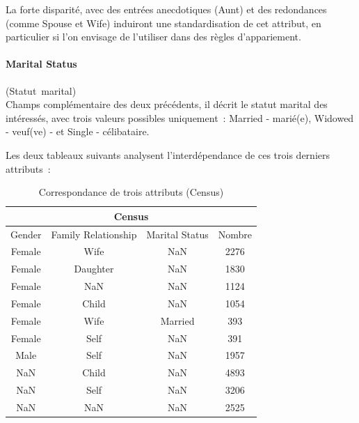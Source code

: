 \documentclass[a4paper,12pt,twoside]{book}
\begin{document}
                La forte disparité, avec des entrées anecdotiques (\og{}Aunt\fg{}) et des redondances (comme \og{}Spouse\fg{} et \og{}Wife\fg{}) induiront une standardisation de cet attribut, en particulier si l'on envisage de l'utiliser dans des règles d'appariement.
                
                \paragraph{Marital Status}\mbox{(Statut marital)} \\
                
                Champs complémentaire des deux précédents, il décrit le statut marital des intéressés, avec trois valeurs possibles uniquement~: \og{}Married\fg{} - marié(e), \og{}Widowed\fg{} - veuf(ve) - et \og{}Single\fg{} - célibataire.
                
                Les deux tableaux suivants analysent l'interdépendance de ces trois derniers attributs~:
                
                \pagebreak
                
                \begin{table}[ht]
                    \centering
                    \renewcommand\cellalign{cl}
                        \begin{tabular}{|c|c|c|c|}
                            \hline
                            \multicolumn{4}{|c|}{Census} \\
                            \hline
                            Gender & Family Relationship & Marital Status & Nombre \\\hline
                            Female & Wife & NaN & 2276 \\
                            Female & Daughter & NaN & 1830 \\
                            Female & NaN & NaN & 1124 \\
                            Female & Child & NaN & 1054 \\
                            Female & Wife & Married & 393 \\
                            Female & Self & NaN & 391 \\\hline
                            Male & Self & NaN & 1957 \\\hline
                            NaN & Child & NaN & 4893 \\
                            NaN & Self & NaN & 3206 \\
                            NaN & NaN & NaN & 2525 \\\hline
                        \end{tabular}
                    \caption[Correspondance de trois attributs Census]{Correspondance de trois attributs (Census)\footnotemark}\label{tab7}
                \end{table}
                
\end{document}
